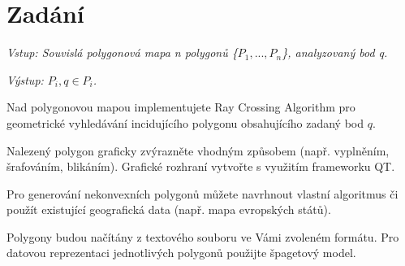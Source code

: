 \section*{Zadání}
\noindent\textit{Vstup: Souvislá polygonová mapa n polygonů \{$P_1, ..., P_n$\}, analyzovaný bod q.}
\vspace{0.8cm}

\noindent\textit{Výstup: $P_i, q \in P_i$.}
\vspace{0.8cm}

\noindent Nad polygonovou mapou implementujete Ray Crossing Algorithm pro geometrické vyhledávání incidujícího polygonu obsahujícího zadaný bod $q$.
\vspace{0.8cm}

\noindent Nalezený polygon graficky zvýrazněte vhodným způsobem (např. vyplněním, šrafováním, blikáním). Grafické rozhraní vytvořte s využitím frameworku QT.
\vspace{0.8cm}

\noindent Pro generování nekonvexních polygonů můžete navrhnout vlastní algoritmus či použít existující geografická data (např. mapa evropských států).
\vspace{0.8cm}

\noindent Polygony budou načítány z textového souboru ve Vámi zvoleném formátu. Pro datovou reprezentaci jednotlivých polygonů použijte špagetový model.
\vspace{1cm}

